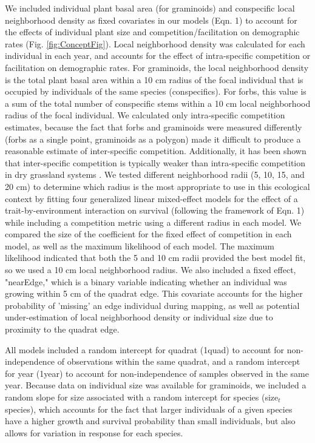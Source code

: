 \documentclass[12pt, letterpaper]{article}
\begin{document}
We included individual plant basal area (for graminoids) and conspecific local neighborhood density as fixed covariates in our models (Eqn. 1) to account for the effects of individual plant size  and competition/facilitation on demographic rates (Fig. \ref{fig:ConceptFig}). Local neighborhood density was calculated for each individual in each year, and accounts for the effect of intra-specific competition or facilitation on demographic rates. For graminoids, the local neighborhood density is the total plant basal area within a 10 cm radius of the focal individual that is occupied by individuals of the same species (conspecifics). For forbs, this value is a sum of the total number of conspecific stems within a 10 cm local neighborhood radius of the focal individual. We calculated only intra-specific competition estimates, because the fact that forbs and graminoids were measured differently (forbs as a single point, graminoids as a polygon) made it difficult to produce a reasonable estimate of inter-specific competition. Additionally, it has been shown that inter-specific competition is typically weaker than intra-specific competition in dry grassland systems \cite{Chu2016, Laughlin2018}. We tested different neighborhood radii (5, 10, 15, and 20 cm) to determine which radius is the most appropriate to use in this ecological context by fitting four generalized linear mixed-effect models for the effect of a trait-by-environment interaction on survival (following the framework of Eqn. 1) while including a competition metric using a different radius in each model. We compared the size of the coefficient for the fixed effect of competition in each model, as well as the maximum likelihood of each model. The maximum likelihood indicated that both the 5 and 10 cm radii provided the best model fit, so we used a 10 cm local neighborhood radius. We also included a fixed effect, "nearEdge," which is a binary variable indicating whether an individual was growing within 5 cm of the quadrat edge. This covariate accounts for the higher probability of ’missing’ an edge individual during mapping, as well as potential under-estimation of local neighborhood density or individual size due to proximity to the quadrat edge.

All models included a random intercept for quadrat (1\textbar quad) to account for non-independence of observations within the same quadrat, and a random intercept for year (1\textbar year) to account for non-independence of samples observed in the same year. Because data on individual size was available for graminoids, we included a random slope for size associated with a random intercept for species (size$_\textit{t}$\textbar species), which accounts for the fact that larger individuals of a given species have a higher growth and survival probability than small individuals, but also allows for variation in response for each species. 
\end{document}
